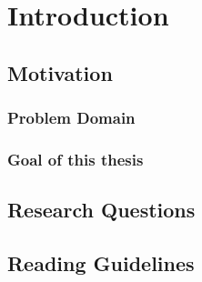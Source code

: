 
\chapter{Introduction} %

\label{ChapterX} %


\section{Motivation}

\subsection{Problem Domain}

\subsection{Goal of this thesis}

\section{Research Questions}

\section{Reading Guidelines}